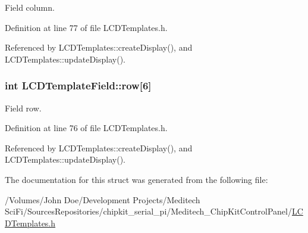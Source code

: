 Field column. 



Definition at line 77 of file L\-C\-D\-Templates.\-h.



Referenced by L\-C\-D\-Templates\-::create\-Display(), and L\-C\-D\-Templates\-::update\-Display().

\hypertarget{struct_l_c_d_template_field_a8c1f20c4249d9b0e338609e89499216e}{
\subsubsection[{row}]{\setlength{\rightskip}{0pt plus 5cm}int L\-C\-D\-Template\-Field\-::row\mbox{[}6\mbox{]}}}\label{struct_l_c_d_template_field_a8c1f20c4249d9b0e338609e89499216e}


Field row. 



Definition at line 76 of file L\-C\-D\-Templates.\-h.



Referenced by L\-C\-D\-Templates\-::create\-Display(), and L\-C\-D\-Templates\-::update\-Display().



The documentation for this struct was generated from the following file\-:\begin{DoxyCompactItemize}
\item 
/\-Volumes/\-John Doe/\-Development Projects/\-Meditech Sci\-Fi/\-Sources\-Repositories/chipkit\-\_\-serial\-\_\-pi/\-Meditech\-\_\-\-Chip\-Kit\-Control\-Panel/\hyperlink{_l_c_d_templates_8h}{L\-C\-D\-Templates.\-h}\end{DoxyCompactItemize}
